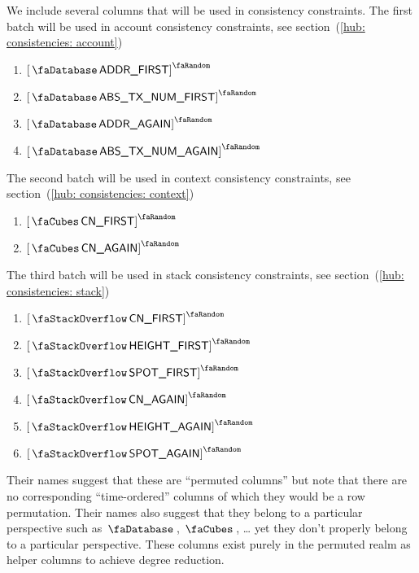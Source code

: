 We include several columns that will be used in consistency constraints.
The first batch will be used in account consistency constraints, see section~(\ref{hub: consistencies: account})
\begin{multicols}{2}
	\begin{enumerate}[resume]
		\item $\accAddressFirst$
		\item $\accAbsTxNumFirst$
		\item $\accAddressAgain$
		\item $\accAbsTxNumAgain$
	\end{enumerate}
\end{multicols}
\noindent The second batch will be used in context consistency constraints, see section~(\ref{hub: consistencies: context})
\begin{multicols}{2}
	\begin{enumerate}[resume]
		\item $\conContextFirst$
		\item $\conContextAgain$
	\end{enumerate}
\end{multicols}
\noindent The third batch will be used in stack consistency constraints, see section~(\ref{hub: consistencies: stack})
\begin{multicols}{2}
	\begin{enumerate}[resume]
		\item $\stackContextFirst$
		\item $\stackHeightFirst$
		\item $\stackSpotFirst$
		\item $\stackContextAgain$
		\item $\stackHeightAgain$
		\item $\stackSpotAgain$
	\end{enumerate}
\end{multicols}
\saNote{} 
Their names suggest that these are ``permuted columns'' but note that there are no corresponding ``time-ordered'' columns of which they would be a row permutation.
Their names also suggest that they belong to a particular perspective such as $\accountSignifier$, $\contextSignifier$, \dots{} yet they don't properly belong to a particular perspective.
These columns exist purely in the permuted realm as helper columns to achieve degree reduction.

